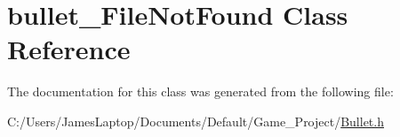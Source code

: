 \hypertarget{classbullet___file_not_found}{}\section{bullet\+\_\+\+File\+Not\+Found Class Reference}
\label{classbullet___file_not_found}


The documentation for this class was generated from the following file\+:\begin{DoxyCompactItemize}
\item 
C\+:/\+Users/\+James\+Laptop/\+Documents/\+Default/\+Game\+\_\+\+Project/\hyperlink{_bullet_8h}{Bullet.\+h}\end{DoxyCompactItemize}
